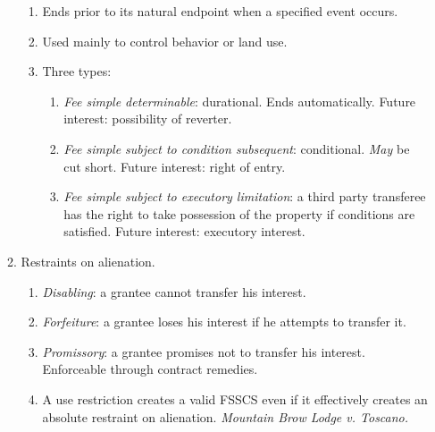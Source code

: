 \begin{enumerate}
\begin{enumerate}
        \begin{enumerate}
            \item Ends prior to its natural endpoint when a specified event 
            occurs.
            \item Used mainly to control behavior or land use.
            \item Three types:
            \begin{enumerate}
                \item \emph{Fee simple determinable}: durational. Ends 
                automatically. Future interest: possibility of reverter.
                \item \emph{Fee simple subject to condition subsequent}: 
                conditional. \emph{May} be cut short. Future interest: right 
                of entry.
                \item \emph{Fee simple subject to executory limitation}: a 
                third party transferee has the right to take possession of the 
                property if conditions are satisfied. Future interest: 
                executory interest.
            \end{enumerate}
        \end{enumerate}
        \item Restraints on alienation.
        \begin{enumerate}
            \item \emph{Disabling}: a grantee cannot transfer his interest.
            \item \emph{Forfeiture}: a grantee loses his interest if he attempts to 
            transfer it.
            \item \emph{Promissory}: a grantee promises not to transfer his 
            interest. Enforceable through contract remedies.
            \item A use restriction creates a valid FSSCS even if it 
            effectively creates an absolute restraint on 
            alienation. \emph{Mountain Brow Lodge v. Toscano.}
        \end{enumerate}
    \end{enumerate}
\end{enumerate}
